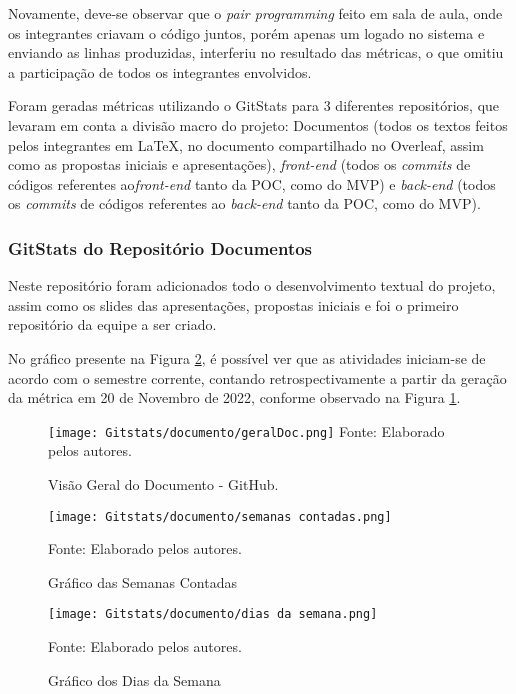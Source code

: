\documentclass[
    12pt,               %
    openright,          %
    oneside,
    a4paper,            %
    BIBLATEX,           %
    TODO,               %
    english,            %
    brazil              %
    ]{ifsp-spo-inf-ctds}
\begin{document}
    Novamente, deve-se observar que o \emph{pair programming} feito em sala de aula, onde os integrantes criavam o código juntos, porém apenas um logado no sistema e enviando as linhas produzidas, interferiu no resultado das métricas, o que omitiu a participação de todos os integrantes envolvidos.

    Foram geradas métricas utilizando o GitStats para 3 diferentes repositórios, que levaram em conta a divisão macro do projeto: Documentos (todos os textos feitos pelos integrantes em LaTeX, no documento compartilhado no Overleaf, assim como as propostas iniciais e apresentações), \emph{front-end} (todos os \emph{commits} de códigos referentes ao\emph{front-end} tanto da POC, como do MVP) e \emph{back-end} (todos os \emph{commits} de códigos referentes ao \emph{back-end} tanto da POC, como do MVP).


    \subsubsection{GitStats do Repositório Documentos}

    Neste repositório foram adicionados todo o desenvolvimento textual do projeto, assim como os slides das apresentações, propostas iniciais e foi o primeiro repositório da equipe a ser criado. 

    No gráfico presente na Figura \ref{fig:semanas contadas}, é possível ver que as atividades iniciam-se de acordo com o semestre corrente, contando retrospectivamente a partir da geração da métrica em 20 de Novembro de 2022, conforme observado na Figura \ref{fig:geralDoc}.

    \begin{figure}[H]
            \centering
            \caption{Visão Geral do Documento - GitHub.}
            \texttt{[image: Gitstats/documento/geralDoc.png]}
            {\footnotesize Fonte: Elaborado pelos autores.}
            \label{fig:geralDoc}
    \end{figure}


    \begin{figure}[H]
            \centering
            \caption{Gráfico das Semanas Contadas}
            \texttt{[image: Gitstats/documento/semanas contadas.png]}
            \label{fig:semanas contadas}
            \centering

        \footnotesize Fonte: Elaborado pelos autores.
    \end{figure}

    \begin{figure}[H]
            \centering
            \caption{Gráfico dos Dias da Semana}
            \texttt{[image: Gitstats/documento/dias da semana.png]}

            \label{fig:diadasemana}
            \centering
            \footnotesize Fonte: Elaborado pelos autores.
    \end{figure} 
\end{document}
